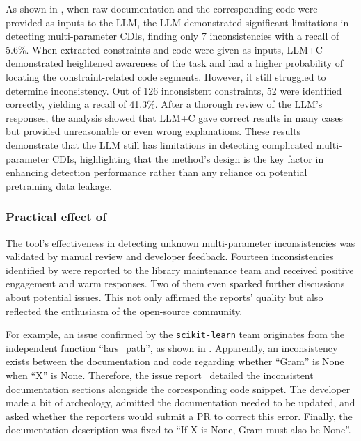 As shown in , when raw documentation and the corresponding code were provided as inputs to the LLM, the LLM demonstrated significant limitations in detecting multi-parameter CDIs, finding only 7 inconsistencies with a recall of 5.6\%. When extracted constraints and code were given as inputs, LLM+C demonstrated heightened awareness of the task and had a higher probability of locating the constraint-related code segments. However, it still struggled to determine inconsistency. Out of 126 inconsistent constraints, 52 were identified correctly, yielding a recall of 41.3\%. After a thorough review of the LLM's responses, the analysis showed that LLM+C gave correct results in many cases but provided unreasonable or even wrong explanations. These results demonstrate that the LLM still has limitations in detecting complicated multi-parameter CDIs, highlighting that the method’s design is the key factor in enhancing detection performance rather than any reliance on potential pretraining data leakage.



\smallskip
\noindent{}



\subsubsection{Practical effect of \toolchecker}
The tool's effectiveness in detecting unknown multi-parameter inconsistencies was validated by manual review and developer feedback. Fourteen inconsistencies identified by \toolchecker were reported to the library maintenance team and received positive engagement and warm responses. Two of them even sparked further discussions about potential issues. This not only affirmed the reports' quality but also reflected the enthusiasm of the open-source community.

For example, an issue confirmed by the \texttt{scikit-learn} team originates from the independent function ``lars\_path'', as shown in . Apparently, an inconsistency exists between the documentation and code regarding whether ``Gram'' is None when ``X'' is None. Therefore, the issue report~\cite{issue30099} detailed the inconsistent documentation sections alongside the corresponding code snippet. The developer made a bit of archeology, admitted the documentation needed to be updated, and asked whether the reporters would submit a PR to correct this error. Finally, the documentation description was fixed to ``If X is None, Gram must also be None''.

